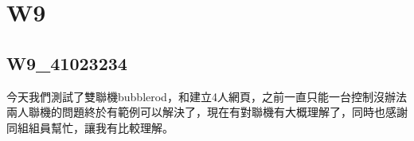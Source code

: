 \chapter{W9}
\section{W9_41023234}
今天我們測試了雙聯機bubblerod，和建立4人網頁，之前一直只能一台控制沒辦法兩人聯機的問題終於有範例可以解決了，現在有對聯機有大概理解了，同時也感謝同組組員幫忙，讓我有比較理解。\\
